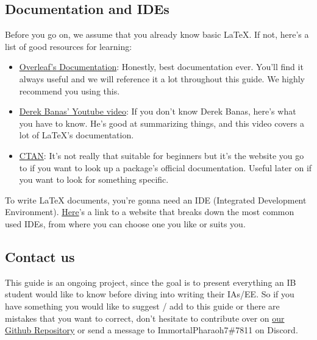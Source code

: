 \subsection{Documentation and IDEs}
Before you go on, we assume that you already know basic \LaTeX{}.
If not, here's a list of good resources for learning:
\begin{itemize}
\item \href{https://www.overleaf.com/learn/latex/Main_Page}{Overleaf's Documentation}:
Honestly, best documentation ever.
You'll find it always useful and we will reference it a lot throughout this guide.
We highly recommend you using this.
\item \href{https://www.youtube.com/watch?v=VhmkLrOjLsw}{Derek Banas' Youtube video}:
If you don't know Derek Banas, here's what you have to know.
He's good at summarizing things, and this video covers a lot of \LaTeX{}'s documentation.
\item \href{https://ctan.org/}{CTAN}: It's not really that suitable for beginners but
it's the website you go to if you want to look up a package's official documentation.
Useful later on if you want to look for something specific.
\end{itemize}

To write \LaTeX{} documents, you're gonna need an IDE (Integrated Development Environment).
\href{https://beebom.com/best-latex-editors/}{Here}'s a link to a website that breaks down the most common used IDEs,
from where you can choose one you like or suits you.

\subsection{Contact us}
This guide is an ongoing project,
since the goal is to present everything an IB student would like to know before diving into writing their IAs/EE.
So if you have something you would like to suggest / add to this guide
or there are mistakes that you want to correct,
don't hesitate to contribute over on \href{https://github.com/ImmortalPharaoh7/Latex-For-The-IB}{our Github Repository}
or send a message to ImmortalPharaoh7\#7811 on Discord.